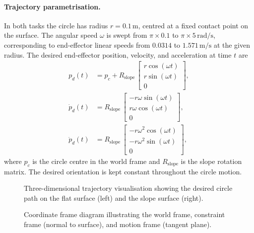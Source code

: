 \documentclass[
	german,%
	accentcolor=9c,%
	ruledheaders=section,%
	class=report,%
	thesis={type=bachelor},%
	fontsize=11pt,%
	parskip=half-,%
	custommargins=true,%
	marginpar=false,%
]{tudapub}
\begin{document}
\paragraph{Trajectory parametrisation.}
In both tasks the circle has radius \(r = 0.1\,\mathrm{m}\), centred at a
fixed contact point on the surface.
The angular speed \(\omega\) is swept from \(\pi \times 0.1\) to
\(\pi \times 5\,\mathrm{rad/s}\), corresponding to end-effector linear speeds
from \(0.0314\) to \(1.571\,\mathrm{m/s}\) at the given radius.
The desired end-effector position, velocity, and acceleration at time \(t\) are
\begin{align}
    p_d(t) &= p_c + R_\text{slope}\,
              \begin{bmatrix}
                  r\cos(\omega t) \\ r\sin(\omega t) \\ 0
              \end{bmatrix}, \\
    \dot{p}_d(t) &= R_\text{slope}\,
              \begin{bmatrix}
                  -r\omega\sin(\omega t) \\ r\omega\cos(\omega t) \\ 0
              \end{bmatrix}, \\
    \ddot{p}_d(t) &= R_\text{slope}\,
              \begin{bmatrix}
                  -r\omega^2\cos(\omega t) \\ -r\omega^2\sin(\omega t) \\ 0
              \end{bmatrix},
\end{align}
where \(p_c\) is the circle centre in the world frame and \(R_\text{slope}\)
is the slope rotation matrix.
The desired orientation is kept constant throughout the circle motion.

\begin{figure}[htbp]
    \centering
    \caption{Three-dimensional trajectory visualisation showing the desired
             circle path on the flat surface (left) and the slope surface
             (right).}
    \label{fig:trajectory_3d}
\end{figure}

\begin{figure}[htbp]
    \centering
    \caption{Coordinate frame diagram illustrating the world frame, constraint
             frame (normal to surface), and motion frame (tangent plane).}
    \label{fig:coord_frames}
\end{figure}
\end{document}
